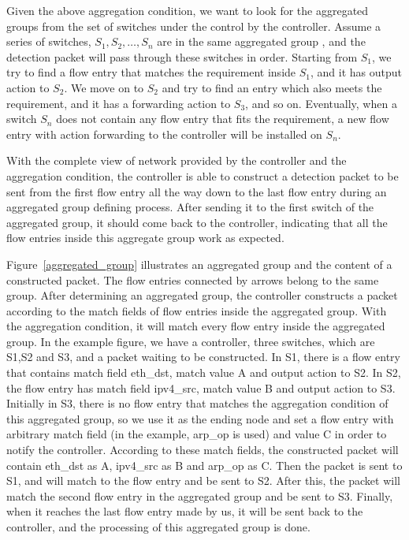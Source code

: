 
Given the above aggregation condition, we want to look for the aggregated groups from the set of switches under the control by the controller. Assume a series of switches, $S_1, S_2, \ldots, S_n$ are in the same aggregated group , and the detection packet will pass through these switches in order. Starting from $S_1$, we try to find a flow entry that matches the requirement inside $S_{1}$, and it has output action to $S_2$. We move on to $S_2$ and try to find an entry which also meets the requirement, and it has a forwarding action to $S_3$, and so on. Eventually, when a switch $S_n$ does not contain any flow entry that fits the requirement, a new flow entry with action forwarding to the controller will be installed on $S_n$.

With the complete view of network provided by the controller and the aggregation condition, the controller is able to construct a detection packet to be sent from the first flow entry all the way down to the last flow entry during an aggregated group defining process. After sending it to the first switch of the aggregated group, it should come back to the controller, indicating that all the flow entries inside this aggregate group work as expected. 

Figure~\ref{aggregated_group} illustrates an aggregated group and the content of a constructed packet. The flow entries connected by arrows belong to the same group. After determining an aggregated group, the controller constructs a packet according to the match fields of flow entries inside the aggregated group. With the aggregation condition, it will match every flow entry inside the aggregated group. In the example figure, we have a controller, three switches, which are S1,S2 and S3, and a packet waiting to be constructed. In S1, there is a flow entry that contains match field eth\_dst, match value A and output action to S2. In S2, the flow entry has match field ipv4\_src, match value B and output action to S3. Initially in S3, there is no flow entry that matches the aggregation condition of this aggregated group, so we use it as the ending node and set a flow entry with arbitrary match field (in the example, arp\_op is used) and value C in order to notify the controller. According to these match fields, the constructed packet will contain eth\_dst as A, ipv4\_src as B and arp\_op as C. Then the packet is sent to S1, and will match to the flow entry and be sent to S2. After this, the packet will match the second flow entry in the aggregated group and be sent to S3. Finally, when it reaches the last flow entry made by us, it will be sent back to the controller, and the processing of this aggregated group is done.

